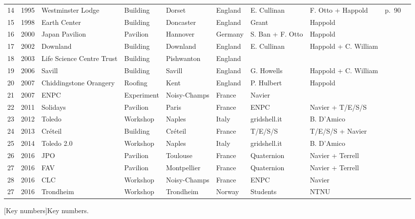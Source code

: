 \begin{landscape}
\begin{table}[p]
\begin{tabular}{@{}llll  lllllr@{}}
14 & 1995 & Westminster Lodge & Building & Dorset & England & E. Cullinan & F. Otto + Happold & p.~90 & \cite{Burton1998}\\
15 & 1998 & Earth Center & Building & Doncaster & England & Grant & Happold &  & \\
16 & 2000 & Japan Pavilion & Pavilion & Hannover & Germany & S. Ban + F. Otto & Happold &  & \cite{Ban2006}\\
17 & 2002 & Downland & Building & Downland & England & E. Cullinan & Happold + C. William &  & \cite{Harris2003}\\
18 & 2003 & Life Science Centre Trust & Building & Pishwanton & England &  &  &  & \\
19 & 2006 & Savill & Building & Savill & England & G. Howells & Happold + C. William &  & \cite{Harris2008}\\
20 & 2007 & Chiddingstone Orangery & Roofing & Kent & England & P. Hulbert & Happold &  & \\
21 & 2007 & ENPC & Experiment & Noisy-Champs & France & Navier & 
 &  & \cite{Douthe2006}\\
22 & 2011 & Solidays & Pavilion & Paris & France & ENPC & Navier + T/E/S/S &  & \cite{Baverel2012}\\
23 & 2012 & Toledo & Workshop & Naples & Italy & gridshell.it & B. D'Amico &  & \cite{DAmico2014}\\
24 & 2013 & Créteil & Building & Créteil & France & T/E/S/S & T/E/S/S + Navier &  & \cite{DuPeloux2016}\\
25 & 2014 & Toledo 2.0 & Workshop & Naples & Italy & gridshell.it & B. D'Amico &  & \cite{DAmico2015a}\\
26 & 2016 & JPO & Pavilion & Toulouse & France & Quaternion & Navier + Terrell &  & \\
27 & 2016 & FAV & Pavilion & Montpellier & France & Quaternion & Navier + Terrell &  & \\
28 & 2016 & CLC & Workshop & Noisy-Champs & France & ENPC & Navier &  & \\
27 & 2016 & Trondheim & Workshop & Trondheim & Norway & Students & NTNU &  & \cite{Mork2016}\\
 	\end{tabular}
[Key numbers]{Key numbers.}
\end{table}
\end{landscape}%


\clearpage

